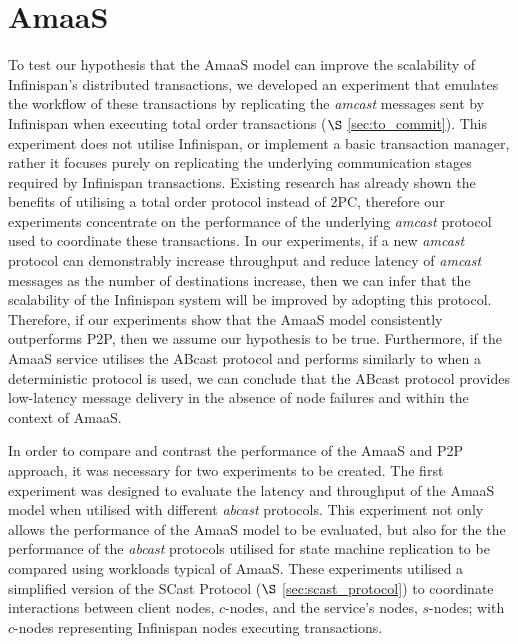 \section{AmaaS}\label{sec:emulated_transactions}
	To test our hypothesis that the \textsf{AmaaS} model can improve the scalability of Infinispan's distributed transactions, we developed an experiment that emulates the workflow of these transactions by replicating the \emph{amcast} messages sent by Infinispan when executing total order transactions ($\S$ \ref{sec:to_commit}).  This experiment does not utilise Infinispan, or implement a basic transaction manager, rather it focuses purely on replicating the underlying communication stages required by Infinispan transactions.  Existing research \citep{Ruivo:2011:ETO:2120967.2121604} has already shown the benefits of utilising a total order protocol instead of 2PC, therefore our experiments concentrate on the performance of the underlying \emph{amcast} protocol used to coordinate these transactions.  In our experiments, if a new \emph{amcast} protocol can demonstrably increase throughput and reduce latency of \emph{amcast} messages as the number of destinations increase,  then we can infer that the scalability of the Infinispan system will be improved by adopting this protocol.  Therefore, if our experiments show that the \textsf{AmaaS} model consistently outperforms P2P, then we assume our hypothesis to be true. Furthermore, if the \textsf{AmaaS} service utilises the \textsf{ABcast} protocol and performs similarly to when a deterministic protocol is used, we can conclude that the \textsf{ABcast} protocol provides low-latency message delivery in the absence of node failures and within the context of \textsf{AmaaS}.  
	
   In order to compare and contrast the performance of the \textsf{AmaaS} and P2P approach, it was necessary for two experiments to be created.  The first experiment was designed to evaluate the latency and throughput of the \textsf{AmaaS} model when utilised with different \emph{abcast} protocols.  This experiment not only allows the performance of the \textsf{AmaaS} model to be evaluated, but also for the the performance of the \emph{abcast} protocols utilised for state machine replication to be compared using workloads typical of \textsf{AmaaS}.  These experiments utilised a simplified version of the \textsf{SCast} Protocol ($\S$ \ref{sec:scast_protocol}) to coordinate interactions between client nodes, $c$-nodes, and the service's nodes, $s$-nodes; with $c$-nodes representing Infinispan nodes executing transactions.  
   
